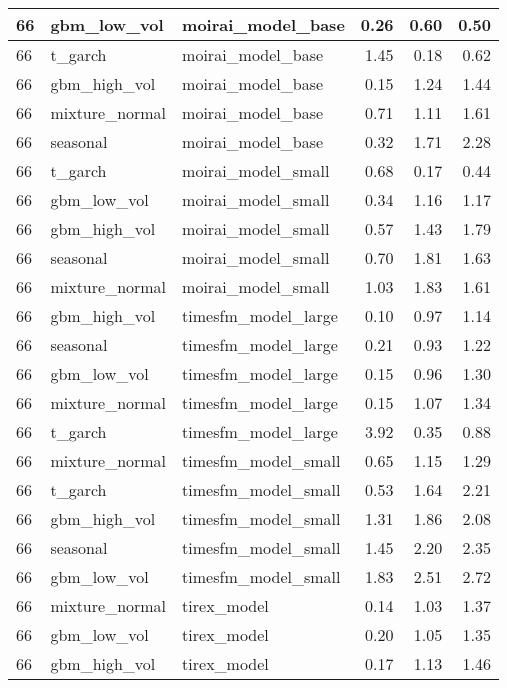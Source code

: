 {\begin{tabular}{lllrrr}
\midrule
66 & gbm\_low\_vol & moirai\_model\_base & 0.26 & 0.60 & 0.50 \\
\midrule
66 & t\_garch & moirai\_model\_base & 1.45 & 0.18 & 0.62 \\
\midrule
66 & gbm\_high\_vol & moirai\_model\_base & 0.15 & 1.24 & 1.44 \\
\midrule
66 & mixture\_normal & moirai\_model\_base & 0.71 & 1.11 & 1.61 \\
\midrule
66 & seasonal & moirai\_model\_base & 0.32 & 1.71 & 2.28 \\
\midrule
66 & t\_garch & moirai\_model\_small & 0.68 & 0.17 & 0.44 \\
\midrule
66 & gbm\_low\_vol & moirai\_model\_small & 0.34 & 1.16 & 1.17 \\
\midrule
66 & gbm\_high\_vol & moirai\_model\_small & 0.57 & 1.43 & 1.79 \\
\midrule
66 & seasonal & moirai\_model\_small & 0.70 & 1.81 & 1.63 \\
\midrule
66 & mixture\_normal & moirai\_model\_small & 1.03 & 1.83 & 1.61 \\
\midrule
66 & gbm\_high\_vol & timesfm\_model\_large & 0.10 & 0.97 & 1.14 \\
\midrule
66 & seasonal & timesfm\_model\_large & 0.21 & 0.93 & 1.22 \\
\midrule
66 & gbm\_low\_vol & timesfm\_model\_large & 0.15 & 0.96 & 1.30 \\
\midrule
66 & mixture\_normal & timesfm\_model\_large & 0.15 & 1.07 & 1.34 \\
\midrule
66 & t\_garch & timesfm\_model\_large & 3.92 & 0.35 & 0.88 \\
\midrule
66 & mixture\_normal & timesfm\_model\_small & 0.65 & 1.15 & 1.29 \\
\midrule
66 & t\_garch & timesfm\_model\_small & 0.53 & 1.64 & 2.21 \\
\midrule
66 & gbm\_high\_vol & timesfm\_model\_small & 1.31 & 1.86 & 2.08 \\
\midrule
66 & seasonal & timesfm\_model\_small & 1.45 & 2.20 & 2.35 \\
\midrule
66 & gbm\_low\_vol & timesfm\_model\_small & 1.83 & 2.51 & 2.72 \\
\midrule
66 & mixture\_normal & tirex\_model & 0.14 & 1.03 & 1.37 \\
\midrule
66 & gbm\_low\_vol & tirex\_model & 0.20 & 1.05 & 1.35 \\
\midrule
66 & gbm\_high\_vol & tirex\_model & 0.17 & 1.13 & 1.46 \\

\end{tabular}}
